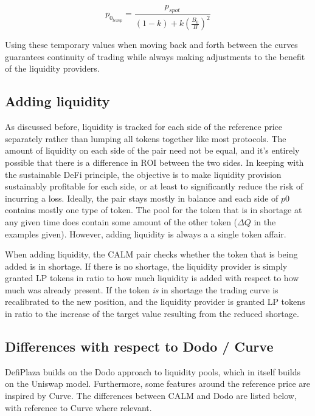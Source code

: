 \documentclass [10pt, twoside] {article}
\begin{document}
\begin{equation} \label{eq:refprice}
	p_{0_{temp}} = \frac{p_{spot}}{(1-k) + k\left(\frac{B_0}{B}\right)^2}
\end{equation}

Using these temporary values when moving back and forth between the curves guarantees continuity of trading while always making adjustments to the benefit of the liquidity providers. 

\subsection{Adding liquidity}
As discussed before, liquidity is tracked for each side of the reference price separately rather than lumping all tokens together like most protocols. The amount of liquidity on each side of the pair need not be equal, and it's entirely possible that there is a difference in ROI between the two sides. In keeping with the sustainable DeFi principle, the objective is to make liquidity provision sustainably profitable for each side, or at least to significantly reduce the risk of incurring a loss. Ideally, the pair stays mostly in balance and each side of $p0$ contains mostly one type of token. The pool for the token that is in shortage at any given time does contain some amount of the other token ($\Delta Q$ in the examples given). However, adding liquidity is always a a single token affair.

When adding liquidity, the CALM pair checks whether the token that is being added is in shortage. If there is no shortage, the liquidity provider is simply granted LP tokens in ratio to how much liquidity is added with respect to how much was already present. If the token \emph{is} in shortage the trading curve is recalibrated to the new position, and the liquidity provider is granted LP tokens in ratio to the increase of the target value resulting from the reduced shortage.

\subsection{Differences with respect to Dodo / Curve}
DefiPlaza builds on the Dodo approach to liquidity pools, which in itself builds on the Uniswap model. Furthermore, some features around the reference price are inspired by Curve. The differences between CALM and Dodo are listed below, with reference to Curve where relevant.
\end{document}
